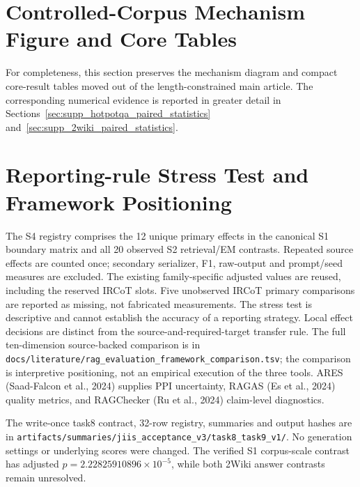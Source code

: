 \documentclass[pdflatex,sn-basic,Numbered]{sn-jnl}
\begin{document}
\section{Controlled-Corpus Mechanism Figure and Core Tables}
\label{sec:supp_controlled_corpus_core}

For completeness, this section preserves the mechanism diagram and compact core-result tables moved out of the length-constrained main article. The corresponding numerical evidence is reported in greater detail in Sections~\ref{sec:supp_hotpotqa_paired_statistics} and~\ref{sec:supp_2wiki_paired_statistics}.

\FloatBarrier







\section{Reporting-rule Stress Test and Framework Positioning}
\label{sec:supp_claim_stress}
The S4 registry comprises the 12 unique primary effects in the canonical S1 boundary matrix and all 20 observed S2 retrieval/EM contrasts. Repeated source effects are counted once; secondary serializer, F1, raw-output and prompt/seed measures are excluded. The existing family-specific adjusted values are reused, including the reserved IRCoT slots. Five unobserved IRCoT primary comparisons are reported as missing, not fabricated measurements. The stress test is descriptive and cannot establish the accuracy of a reporting strategy. Local effect decisions are distinct from the source-and-required-target transfer rule. The full ten-dimension source-backed comparison is in \texttt{docs/literature/rag\_evaluation\_framework\_comparison.tsv}; the comparison is interpretive positioning, not an empirical execution of the three tools. ARES (Saad-Falcon et al., 2024) supplies PPI uncertainty, RAGAS (Es et al., 2024) quality metrics, and RAGChecker (Ru et al., 2024) claim-level diagnostics.


The write-once task8 contract, 32-row registry, summaries and output hashes are in \texttt{artifacts/summaries/jiis\_acceptance\_v3/task8\_task9\_v1/}. No generation settings or underlying scores were changed. The verified S1 corpus-scale contrast has adjusted $p=2.22825910896\times10^{-5}$, while both 2Wiki answer contrasts remain unresolved.
\end{document}
